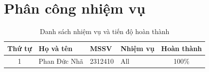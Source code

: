 \section{Phân công nhiệm vụ}
\begin{table}[H]
    \centering
    \renewcommand{\arraystretch}{1.3} %
    \caption{Danh sách nhiệm vụ và tiến độ hoàn thành}
    \label{tab:phancong}
    \begin{tabularx}{\textwidth}{|c|l|l|X|c|}
        \hline
        Thứ tự & Họ và tên & MSSV & Nhiệm vụ & Hoàn thành \\ \hline
        1 & Phan Đức Nhã & 2312410 & 
        All & 100\% \\ \hline
    \end{tabularx}
\end{table}